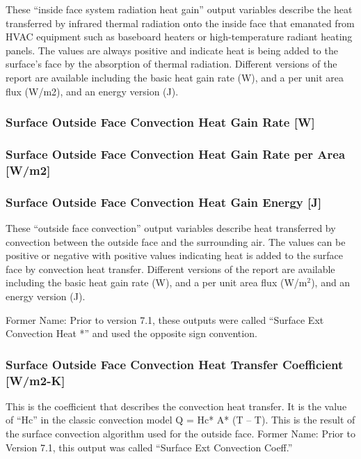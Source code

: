 These ``inside face system radiation heat gain'' output variables describe the heat transferred by infrared thermal radiation onto the inside face that emanated from HVAC equipment such as baseboard heaters or high-temperature radiant heating panels. The values are always positive and indicate heat is being added to the surface's face by the absorption of thermal radiation. Different versions of the report are available including the basic heat gain rate (W), and a per unit area flux (W/m2), and an energy version (J).

\subsubsection{Surface Outside Face Convection Heat Gain Rate {[}W{]}}\label{surface-outside-face-convection-heat-gain-rate-w}

\subsubsection{Surface Outside Face Convection Heat Gain Rate per Area {[}W/m2{]}}\label{surface-outside-face-convection-heat-gain-rate-per-area-wm2}

\subsubsection{Surface Outside Face Convection Heat Gain Energy {[}J{]}}\label{surface-outside-face-convection-heat-gain-energy-j}

These ``outside face convection'' output variables describe heat transferred by convection between the outside face and the surrounding air. The values can be positive or negative with positive values indicating heat is added to the surface face by convection heat transfer. Different versions of the report are available including the basic heat gain rate (W), and a per unit area flux (W/m\(^{2}\)), and an energy version (J).

Former Name: Prior to version 7.1, these outputs were called ``Surface Ext Convection Heat *'' and used the opposite sign convention.

\subsubsection{Surface Outside Face Convection Heat Transfer Coefficient {[}W/m2-K{]}}\label{surface-outside-face-convection-heat-transfer-coefficient-wm2-k}

This is the coefficient that describes the convection heat transfer. It is the value of ``Hc'' in the classic convection model Q = Hc* A* (T -- T). This is the result of the surface convection algorithm used for the outside face. Former Name: Prior to Version 7.1, this output was called ``Surface Ext Convection Coeff.''

